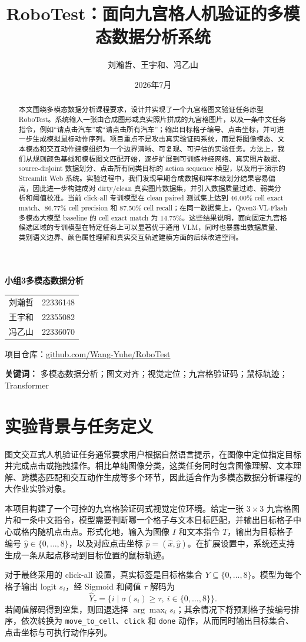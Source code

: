 \documentclass[UTF8,a4paper,12pt,fontset=fandol]{ctexart}
\title{RoboTest：面向九宫格人机验证的多模态数据分析系统}
\author{刘瀚哲、王宇和、冯乙山}
\date{2026年7月}
\makeatletter
\newcommand{\code}[1]{\texttt{#1}}
\renewcommand{\maketitle}{%
  \begin{center}
    \vspace*{0.4em}
    {\heiti\bfseries\LARGE \@title\par}
    \vspace{1.2em}
    {\normalsize\bfseries 小组3\quad 多模态数据分析\par}
    \vspace{0.6em}
    {\small
      \begin{tabular}{c@{\hspace{2.5em}}c}
        刘瀚哲 & 22336148 \\
        王宇和 & 22355082 \\
        冯乙山 & 22336070
      \end{tabular}\par
    }
    \vspace{0.8em}
    {\small \@date\par}
    \vspace{0.45em}
    {\small 项目仓库：\href{https://github.com/Wang-Yuhe/RoboTest.git}{github.com/Wang-Yuhe/RoboTest}\par}
  \end{center}
  \vspace{0.8em}
}
\makeatother
\begin{document}
\maketitle

\begin{abstract}
本文围绕多模态数据分析课程要求，设计并实现了一个九宫格图文验证任务原型 RoboTest。系统输入一张由合成图形或真实照片拼成的九宫格图片，以及一条中文任务指令，例如“请点击汽车”或“请点击所有汽车”；输出目标格子编号、点击坐标，并可进一步生成模拟鼠标动作序列。项目重点不是攻击真实验证码系统，而是将图像模态、文本模态和交互动作建模组织为一个边界清晰、可复现、可评估的实验任务。方法上，我们从规则颜色基线和模板图文匹配开始，逐步扩展到可训练神经网络、真实照片数据、source-disjoint 数据划分、点击所有同类目标的 action sequence 模型，以及用于演示的 Streamlit Web 系统。实验过程中，我们发现早期合成数据和样本级划分结果容易偏高，因此进一步构建成对 dirty/clean 真实图片数据集，并引入数据质量过滤、弱类分析和阈值校准。当前 click-all 专训模型在 clean paired 测试集上达到 46.00\% cell exact match、86.77\% cell precision 和 87.50\% cell recall；在同一数据集上，Qwen3-VL-Flash 多模态大模型 baseline 的 cell exact match 为 14.75\%。这些结果说明，面向固定九宫格候选区域的专训模型在特定任务上可以显著优于通用 VLM，同时也暴露出数据质量、类别语义边界、颜色属性理解和真实交互轨迹建模方面的后续改进空间。
\end{abstract}

\noindent\textbf{关键词：} 多模态数据分析；图文对齐；视觉定位；九宫格验证码；鼠标轨迹；Transformer

\clearpage
\tableofcontents
\clearpage

\section{实验背景与任务定义}

图文交互式人机验证任务通常要求用户根据自然语言提示，在图像中定位指定目标并完成点击或拖拽操作。相比单纯图像分类，这类任务同时包含图像理解、文本理解、跨模态匹配和交互动作生成等多个环节，因此适合作为多模态数据分析课程的大作业实验对象。

本项目构建了一个可控的九宫格验证码式视觉定位环境。给定一张 $3\times3$ 九宫格图片和一条中文指令，模型需要判断哪一个格子与文本目标匹配，并输出目标格子中心或格内随机点击点。形式化地，输入为图像 $I$ 和文本指令 $T$，输出为目标格子编号 $\hat{y}\in\{0,\ldots,8\}$，以及对应点击坐标 $\hat{p}=(\hat{x},\hat{y})$。在扩展设置中，系统还支持生成一条从起点移动到目标位置的鼠标轨迹。

对于最终采用的 click-all 设置，真实标签是目标格集合 $Y\subseteq\{0,\ldots,8\}$。模型为每个格子输出 logit $s_i$，经 Sigmoid 和阈值 $\tau$ 解码为
\[
  \hat{Y}_{\tau}=\{i\mid \sigma(s_i)\geq\tau,\ i\in\{0,\ldots,8\}\}.
\]
若阈值解码得到空集，则回退选择 $\arg\max_i s_i$；其余情况下将预测格子按编号排序，依次转换为 \code{move\_to\_cell}、\code{click} 和 \code{done} 动作，从而同时输出目标集合、点击坐标与可执行动作序列。
\end{document}
